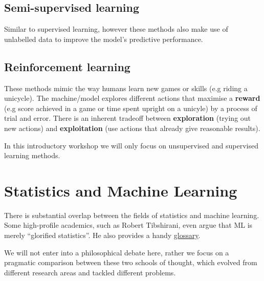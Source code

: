 \documentclass[]{book}
\begin{document}
\hypertarget{semi-supervised-learning}{%
\subsection*{Semi-supervised learning}\label{semi-supervised-learning}}

Similar to supervised learning, however these methods also make use of unlabelled data to improve
the model's predictive performance.

\hypertarget{reinforcement-learning}{%
\subsection*{Reinforcement learning}\label{reinforcement-learning}}

These methods mimic the way humans learn new games or skills (e.g riding a unicycle).
The machine/model explores different actions that maximise a \textbf{reward} (e.g score achieved in a game or
time spent upright on a unicyle) by a process of trial and error.
There is an inherent tradeoff between \textbf{exploration} (trying out new actions) and
\textbf{exploitation} (use actions that already give reasonable results).

In this introductory workshop we will only focus on unsupervised and supervised learning methods.

\hypertarget{statistics-and-machine-learning}{%
\section{Statistics and Machine Learning}\label{statistics-and-machine-learning}}

There is substantial overlap between the fields of statistics and machine learning.
Some high-profile academics, such as Robert Tibshirani, even argue that ML is merely
``glorified statistics''. He also provides a handy \href{http://statweb.stanford.edu/~tibs/stat315a/glossary.pdf}{glossary}.

We will not enter into a philosophical debate here, rather we focus
on a pragmatic comparison between these two schools of thought,
which evolved from different research areas and tackled different problems.
\end{document}
